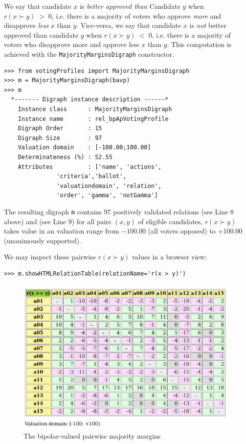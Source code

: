 We say that candidate $x$ is \emph{better approved than} Candidate $y$ when $r(x \succ y)\;>\;0$, i.e. there is a majority of voters who approve \emph{more} and disapprove \emph{less} $x$ than $y$. Vice-versa, we say that candidate $x$ is \emph{not} better approved than candidate $y$ when $r(x \succ y)\;<\;0$, i.e. there is a majority of voters who disapprove more and approve less $x$ than $y$. This computation is achieved with the \texttt{MajorityMarginsDigraph} constructor.
\begin{lstlisting}
>>> from votingProfiles import MajorityMarginsDigraph
>>> m = MajorityMarginsDigraph(bavp)
>>> m
  *------- Digraph instance description ------*
    Instance class      : MajorityMarginsDigraph
    Instance name       : rel_bpApVotingProfile
    Digraph Order       : 15
    Digraph Size        : 97
    Valuation domain    : [-100.00;100.00]
    Determinateness (%) : 52.55
    Attributes          : ['name', 'actions',
               'criteria','ballot',
               'valuationdomain', 'relation',
               'order', 'gamma', 'notGamma']
\end{lstlisting}
The resulting digraph \texttt{m} contains 97 positively validated relations (see Line 8 above) and (see Line 9) for all pairs $(x,y)$ of eligible candidates, $r(x \succ y)$ takes value in an valuation range from $-100.00$ (all voters opposed) to $+100.00$ (unanimously supported).

We may inspect these pairwise $r(x \succ y)$ values in a browser view: 
\begin{lstlisting}
>>> m.showHTMLRelationTable(relationName='r(x > y)')
\end{lstlisting}
\begin{figure}[ht]
\includegraphics[width=\hsize]{Figures/20-3-majMargAV.png}
\caption{The bipolar-valued pairwise majority margins} 
\label{fig:20.3}       %
\end{figure}

